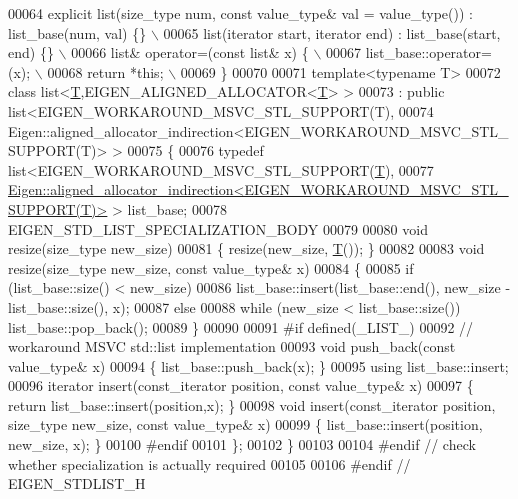 \begin{DoxyCode}
00064 \textcolor{preprocessor}{    explicit list(size\_type num, const value\_type& val = value\_type()) : list\_base(num, val) \{\} \(\backslash\)}
00065 \textcolor{preprocessor}{    list(iterator start, iterator end) : list\_base(start, end) \{\}  \(\backslash\)}
00066 \textcolor{preprocessor}{    list& operator=(const list& x) \{  \(\backslash\)}
00067 \textcolor{preprocessor}{    list\_base::operator=(x);  \(\backslash\)}
00068 \textcolor{preprocessor}{    return *this; \(\backslash\)}
00069 \textcolor{preprocessor}{  \}}
00070 
00071   \textcolor{keyword}{template}<\textcolor{keyword}{typename} T>
00072   \textcolor{keyword}{class }list<\hyperlink{group___sparse_core___module_class_eigen_1_1_triplet}{T},EIGEN\_ALIGNED\_ALLOCATOR<\hyperlink{group___sparse_core___module_class_eigen_1_1_triplet}{T}> >
00073     : \textcolor{keyword}{public} list<EIGEN\_WORKAROUND\_MSVC\_STL\_SUPPORT(T),
00074                   Eigen::aligned\_allocator\_indirection<EIGEN\_WORKAROUND\_MSVC\_STL\_SUPPORT(T)> >
00075   \{
00076     \textcolor{keyword}{typedef} list<EIGEN\_WORKAROUND\_MSVC\_STL\_SUPPORT(\hyperlink{group___sparse_core___module_class_eigen_1_1_triplet}{T}),
00077                  
      \hyperlink{class_eigen_1_1aligned__allocator__indirection}{Eigen::aligned\_allocator\_indirection<EIGEN\_WORKAROUND\_MSVC\_STL\_SUPPORT(T)>}
       > list\_base;
00078     EIGEN\_STD\_LIST\_SPECIALIZATION\_BODY
00079 
00080     \textcolor{keywordtype}{void} resize(size\_type new\_size)
00081     \{ resize(new\_size, \hyperlink{group___sparse_core___module_class_eigen_1_1_triplet}{T}()); \}
00082 
00083     \textcolor{keywordtype}{void} resize(size\_type new\_size, \textcolor{keyword}{const} value\_type& x)
00084     \{
00085       \textcolor{keywordflow}{if} (list\_base::size() < new\_size)
00086         list\_base::insert(list\_base::end(), new\_size - list\_base::size(), x);
00087       \textcolor{keywordflow}{else}
00088         \textcolor{keywordflow}{while} (new\_size < list\_base::size()) list\_base::pop\_back();
00089     \}
00090 
00091 \textcolor{preprocessor}{#if defined(\_LIST\_)}
00092     \textcolor{comment}{// workaround MSVC std::list implementation}
00093     \textcolor{keywordtype}{void} push\_back(\textcolor{keyword}{const} value\_type& x)
00094     \{ list\_base::push\_back(x); \} 
00095     \textcolor{keyword}{using} list\_base::insert;  
00096     iterator insert(const\_iterator position, \textcolor{keyword}{const} value\_type& x)
00097     \{ \textcolor{keywordflow}{return} list\_base::insert(position,x); \}
00098     \textcolor{keywordtype}{void} insert(const\_iterator position, size\_type new\_size, \textcolor{keyword}{const} value\_type& x)
00099     \{ list\_base::insert(position, new\_size, x); \}
00100 \textcolor{preprocessor}{#endif}
00101   \};
00102 \}
00103 
00104 \textcolor{preprocessor}{#endif // check whether specialization is actually required}
00105 
00106 \textcolor{preprocessor}{#endif // EIGEN\_STDLIST\_H}
\end{DoxyCode}
